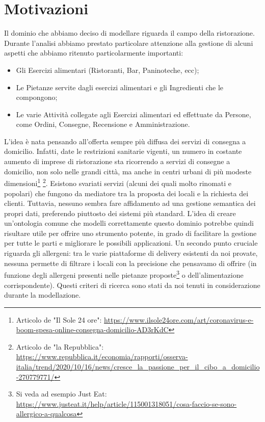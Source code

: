 \documentclass[12pt]{article}
\begin{document}
\section{Motivazioni}
Il dominio che abbiamo deciso di modellare riguarda il campo della ristorazione. 
Durante l'analisi abbiamo prestato particolare attenzione alla gestione di alcuni aspetti che abbiamo ritenuto particolarmente importanti:
\begin{itemize}
    \item Gli Esercizi alimentari (Ristoranti, Bar, Paninoteche, ecc);
    \item Le Pietanze servite dagli esercizi alimentari e gli Ingredienti che le compongono;
    \item Le varie Attività collegate agli Esercizi alimentari ed effettuate da Persone, come Ordini, Consegne, Recensione e Amministrazione.
\end{itemize}
L'idea è nata pensando all'offerta sempre più diffusa dei servizi di consegna a domicilio.
Infatti, date le restrizioni sanitarie vigenti, un numero in costante aumento di imprese di ristorazione sta ricorrendo a servizi di consegne a domicilio, non solo nelle grandi città, ma anche in centri urbani di più modeste dimensioni\footnote{Articolo de "Il Sole 24 ore": \url{https://www.ilsole24ore.com/art/coronavirus-e-boom-spesa-online-consegna-domicilio-AD3rKdC}} \footnote{Articolo de "la Repubblica": \url{https://www.repubblica.it/economia/rapporti/osserva-italia/trend/2020/10/16/news/cresce_la_passione_per_il_cibo_a_domicilio-270779771/}}.\newline
Esistono svariati servizi (alcuni dei quali molto rinomati e popolari) che fungono da mediatore tra la proposta dei locali e la richiesta dei clienti. 
Tuttavia, nessuno sembra fare affidamento ad una gestione semantica dei propri dati, preferendo piuttosto dei sistemi più standard.\newline
L'idea di creare un'ontologia comune che modelli correttamente questo dominio potrebbe quindi risultare utile per offrire uno strumento potente, in grado di facilitare la gestione per tutte le parti e migliorare le possibili applicazioni.\newline
Un secondo punto cruciale riguarda gli allergeni: tra le varie piattaforme di delivery esistenti da noi provate, nessuna permette di filtrare i locali con la precisione che pensavamo di offrire (in funzione degli allergeni presenti nelle pietanze proposte\footnote{Si veda ad esempio Just Eat: \url{https://www.justeat.it/help/article/115001318051/cosa-faccio-se-sono-allergico-a-qualcosa}} o dell'alimentazione corrispondente).
Questi criteri di ricerca sono stati da noi tenuti in considerazione durante la modellazione.
\end{document}

